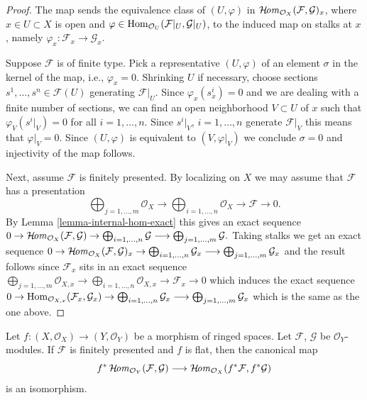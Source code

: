 \begin{proof}
The map sends the equivalence class of
$(U, \varphi)$ in $\mathop{\mathcal{H}\!\mathit{om}}\nolimits_{\mathcal{O}_X}(\mathcal{F}, \mathcal{G})_x$,
where $x \in U \subset X$ is open and
$\varphi \in \mathop{\mathrm{Hom}}\nolimits_{\mathcal{O}_U}(\mathcal{F}|_U, \mathcal{G}|_U)$,
to the induced map on stalks at $x$, namely
$\varphi_x : \mathcal{F}_x \to \mathcal{G}_x$.

\medskip\noindent
Suppose $\mathcal{F}$ is of finite type.
Pick a representative $(U, \varphi)$ of an element $\sigma$
in the kernel of the map, i.e., $\varphi_x = 0$.
Shrinking $U$ if necessary, choose sections
$s^1, \ldots, s^n \in \mathcal{F}(U)$ generating $\mathcal{F}|_U$.
Since $\varphi_x(s^i_x) = 0$
and we are dealing with a finite number of sections,
we can find an open neighborhood 
$V \subset U$ of $x$ such that $\varphi_V(s^i|_V)=0$
for all $i = 1, \ldots, n$. Since $s^i|_V$, $i = 1, \ldots, n$ generate
$\mathcal{F}|_V$ this means that $\varphi|_V = 0$.
Since $(U, \varphi)$ is equivalent to $(V, \varphi|_V)$
we conclude $\sigma = 0$ and injectivity of the map follows.

\medskip\noindent
Next, assume $\mathcal{F}$ is finitely presented.
By localizing on $X$ we may assume that $\mathcal{F}$ has a presentation
$$
\bigoplus\nolimits_{j = 1, \ldots, m}
\mathcal{O}_X
\longrightarrow
\bigoplus\nolimits_{i = 1, \ldots, n}
\mathcal{O}_X
\to
\mathcal{F}
\to
0.
$$
By Lemma \ref{lemma-internal-hom-exact} this gives an exact sequence
$
0 \to
\mathop{\mathcal{H}\!\mathit{om}}\nolimits_{\mathcal{O}_X}(\mathcal{F}, \mathcal{G}) \to
\bigoplus\nolimits_{i = 1, \ldots, n} \mathcal{G}
\longrightarrow
\bigoplus\nolimits_{j = 1, \ldots, m} \mathcal{G}.
$
Taking stalks we get an exact sequence
$
0 \to
\mathop{\mathcal{H}\!\mathit{om}}\nolimits_{\mathcal{O}_X}(\mathcal{F}, \mathcal{G})_x \to
\bigoplus\nolimits_{i = 1, \ldots, n} \mathcal{G}_x
\longrightarrow
\bigoplus\nolimits_{j = 1, \ldots, m} \mathcal{G}_x
$
and the result follows since $\mathcal{F}_x$ sits in
an exact sequence
$
\bigoplus\nolimits_{j = 1, \ldots, m}
\mathcal{O}_{X, x}
\longrightarrow
\bigoplus\nolimits_{i = 1, \ldots, n}
\mathcal{O}_{X, x}
\to
\mathcal{F}_x
\to
0
$
which induces the exact sequence
$
0 \to
\mathop{\mathrm{Hom}}\nolimits_{\mathcal{O}_{X, x}}(\mathcal{F}_x, \mathcal{G}_x) \to
\bigoplus\nolimits_{i = 1, \ldots, n} \mathcal{G}_x
\longrightarrow
\bigoplus\nolimits_{j = 1, \ldots, m} \mathcal{G}_x
$
which is the same as the one above.
\end{proof}

\begin{lemma}
\label{lemma-pullback-internal-hom}
Let $f : (X, \mathcal{O}_X) \to (Y, \mathcal{O}_Y)$ be a morphism
of ringed spaces. Let $\mathcal{F}$, $\mathcal{G}$ be $\mathcal{O}_Y$-modules.
If $\mathcal{F}$ is finitely presented and $f$ is flat,
then the canonical map
$$
f^*\mathop{\mathcal{H}\!\mathit{om}}\nolimits_{\mathcal{O}_Y}(\mathcal{F}, \mathcal{G})
\longrightarrow
\mathop{\mathcal{H}\!\mathit{om}}\nolimits_{\mathcal{O}_X}(f^*\mathcal{F}, f^*\mathcal{G})
$$
is an isomorphism.
\end{lemma}

